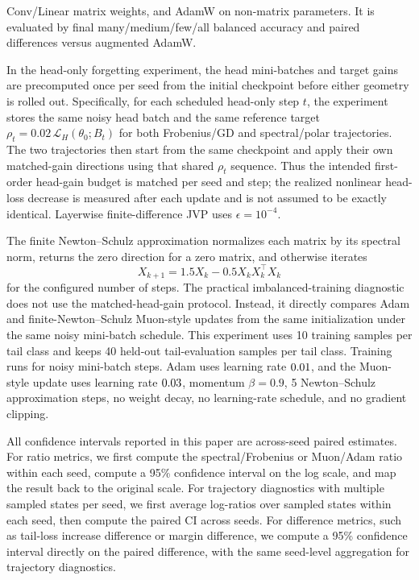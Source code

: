 \documentclass{article}
\theoremstyle{definition}
\newcommand{\Loss}{\mathcal L}
\begin{document}
Conv/Linear matrix weights, and AdamW on non-matrix parameters. It is evaluated by final many/medium/few/all balanced accuracy and paired differences versus augmented AdamW.

In the head-only forgetting experiment, the head mini-batches and target gains are precomputed once per seed from the initial checkpoint before either geometry is rolled out. Specifically, for each scheduled head-only step \(t\), the experiment stores the same noisy head batch and the same reference target \(\rho_t=0.02\,\Loss_H(\theta_0;B_t)\) for both Frobenius/GD and spectral/polar trajectories. The two trajectories then start from the same checkpoint and apply their own matched-gain directions using that shared \(\rho_t\) sequence. Thus the intended first-order head-gain budget is matched per seed and step; the realized nonlinear head-loss decrease is measured after each update and is not assumed to be exactly identical. Layerwise finite-difference JVP uses \(\epsilon=10^{-4}\).

The finite Newton--Schulz approximation normalizes each matrix by its spectral norm, returns the zero direction for a zero matrix, and otherwise iterates
\[
X_{k+1}=1.5X_k-0.5X_kX_k^\top X_k
\]
for the configured number of steps. The practical imbalanced-training diagnostic does not use the matched-head-gain protocol. Instead, it directly compares Adam and finite-Newton--Schulz Muon-style updates from the same initialization under the same noisy mini-batch schedule. This experiment uses 10 training samples per tail class and keeps 40 held-out tail-evaluation samples per tail class. Training runs for \EelevenLongTailPracticalTrainingSteps{} noisy mini-batch steps. Adam uses learning rate \(0.01\), and the Muon-style update uses learning rate \(0.03\), momentum \(\beta=0.9\), 5 Newton--Schulz approximation steps, no weight decay, no learning-rate schedule, and no gradient clipping.

All confidence intervals reported in this paper are across-seed paired estimates. For ratio metrics, we first compute the spectral/Frobenius or Muon/Adam ratio within each seed, compute a 95\% confidence interval on the log scale, and map the result back to the original scale. For trajectory diagnostics with multiple sampled states per seed, we first average log-ratios over sampled states within each seed, then compute the paired CI across seeds. For difference metrics, such as tail-loss increase difference or margin difference, we compute a 95\% confidence interval directly on the paired difference, with the same seed-level aggregation for trajectory diagnostics.
\end{document}
